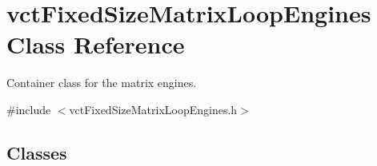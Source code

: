 \hypertarget{classvct_fixed_size_matrix_loop_engines}{}\section{vct\+Fixed\+Size\+Matrix\+Loop\+Engines Class Reference}
\label{classvct_fixed_size_matrix_loop_engines}


Container class for the matrix engines.  




{\ttfamily \#include $<$vct\+Fixed\+Size\+Matrix\+Loop\+Engines.\+h$>$}

\subsection*{Classes}
